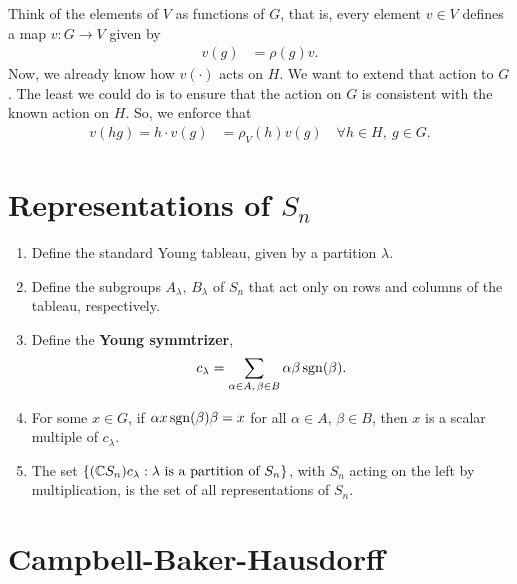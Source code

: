 Think of the elements of $V$ as functions of $G$, that is, every element $v\in V$ defines a map $v: G\to V$ given by
\begin{align}
    v(g) &= \rho(g) v.
\end{align}
Now, we already know how $v(\cdot)$ acts on $H$. We want to extend that action to $G$. The least we could do is to ensure that the action on $G$ is consistent with the known action on $H$. So, we enforce that
\begin{align}
    v(hg) = h\cdot v(g) &= \rho_V(h) v(g)\quad \forall h\in H,\ g\in G.
\end{align}

\begin{insight}
\end{insight}

\chapter{Representations of \texorpdfstring{$S_n$}{Sn}}
\label{cha:representations_of_s_n_s_n_}
\begin{enumerate}
    \item Define the standard Young tableau, given by a partition $\lambda$.
    \item Define the subgroups $A_\lambda,\, B_\lambda$ of $S_n$ that act only on rows and columns of the tableau, respectively.
    \item Define the \textbf{Young symmtrizer},
        \begin{align}
            c_\lambda = \sum_{\substack{\alpha\in A,\, \beta\in B}} \alpha \beta \operatorname{sgn}(\beta).
        \end{align}
    \item For some $x\in G$, if $\alpha x \operatorname{sgn}(\beta)\beta = x$ for all $\alpha\in A,\, \beta\in B$, then $x$ is a scalar multiple of $c_\lambda$.
    \item The set $\{(\mathbb{C} S_n )c_\lambda : \lambda \text{ is a partition of } S_n\}$, with $S_n$ acting on the left by multiplication, is the set of all representations of $S_n$.
\end{enumerate}

\chapter{Campbell-Baker-Hausdorff}
\section{}

